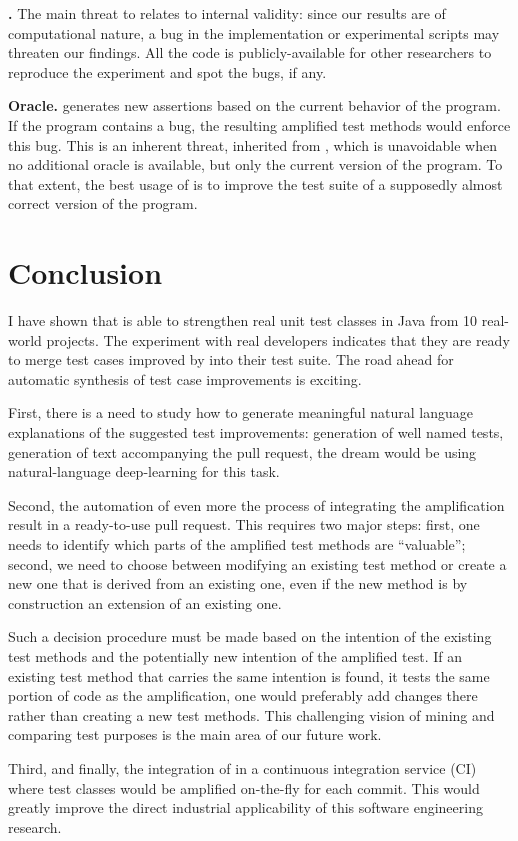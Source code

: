 \textbf{\rqAmplVersusIAmpl{}.}
The main threat to \rqAmplVersusIAmpl{} relates to internal validity: since our results are of computational nature, a bug in the implementation or experimental scripts may threaten our findings. 
All the code is publicly-available for other researchers to reproduce the experiment and spot the bugs, if any.

\textbf{Oracle.}
\dspot generates new assertions based on the current behavior of the program. 
If the program contains a bug, the resulting amplified test methods would enforce this bug. 
This is an inherent threat, inherited from \cite{Xie2006}, which is unavoidable when no additional oracle is available, but only the current version of the program. 
To that extent, the best usage of \dspot is to improve the test suite of a supposedly almost correct version of the program.

\section{Conclusion}
\label{sec:test-improvement:conclusion}

I have shown that \dspot is able to strengthen real unit test classes in Java from 10 real-world projects. 
The experiment with real developers indicates that they are ready to merge test cases improved by \dspot into their test suite. 
The road ahead for automatic synthesis of test case improvements is exciting.

First, there is a need to study how to generate meaningful natural language explanations of the suggested test improvements: generation of well named tests, generation of text accompanying the pull request, the dream would be using natural-language deep-learning for this task.

Second, the automation of even more the process of integrating the amplification result in a ready-to-use pull request. 
This requires two major steps: 
first, one needs to identify which parts of the amplified test methods are ``valuable'';
second, we need to choose between modifying an existing test method or create a new one that is derived from an existing one, even if the new method is by construction an extension of an existing one. 

Such a decision procedure must be made based on the intention of the existing test methods and the potentially new intention of the amplified test. 
If an existing test method that carries the same intention is found, \ie it tests the same portion of code as the amplification, one would preferably add changes there rather than creating a new test methods. 
This challenging vision of mining and comparing test purposes is the main area of our future work.

Third, and finally, the integration of \dspot in a continuous integration service (CI) where test classes would be amplified on-the-fly for each commit. 
This would greatly improve the direct industrial applicability of this software engineering research.